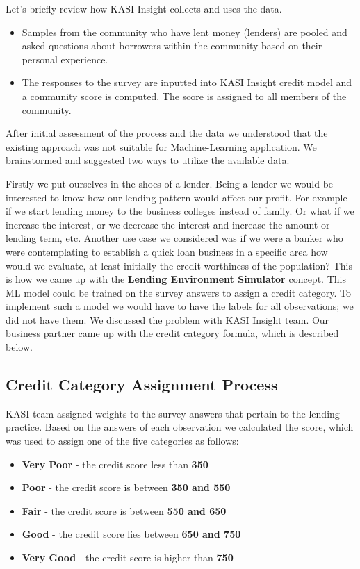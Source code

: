 Let's briefly review how KASI Insight collects and uses the data.

\begin{itemize}
\item
  Samples from the community who have lent money (lenders) are pooled
  and asked questions about borrowers within the community based on
  their personal experience.
\item
  The responses to the survey are inputted into KASI Insight credit
  model and a community score is computed. The score is assigned to all
  members of the community.
\end{itemize}

After initial assessment of the process and the data we understood that
the existing approach was not suitable for Machine-Learning application.
We brainstormed and suggested two ways to utilize the available data.

Firstly we put ourselves in the shoes of a lender. Being a lender we
would be interested to know how our lending pattern would affect our
profit. For example if we start lending money to the business colleges
instead of family. Or what if we increase the interest, or we decrease
the interest and increase the amount or lending term, etc. Another use
case we considered was if we were a banker who were contemplating to
establish a quick loan business in a specific area how would we
evaluate, at least initially the credit worthiness of the population?
This is how we came up with the \textbf{Lending Environment Simulator}
concept. This ML model could be trained on the survey answers to assign
a credit category. To implement such a model we would have to have the
labels for all observations; we did not have them. We discussed the
problem with KASI Insight team. Our business partner came up with the
credit category formula, which is described below.

\hypertarget{credit-category-assignment-process}{%
\subsection{Credit Category Assignment
Process}\label{credit-category-assignment-process}}

KASI team assigned weights to the survey answers that pertain to the
lending practice. Based on the answers of each observation we calculated
the score, which was used to assign one of the five categories as
follows:

\begin{itemize}
\tightlist
\item
  \textbf{Very Poor} - the credit score less than \textbf{350}
\item
  \textbf{Poor} - the credit score is between \textbf{350 and 550}
\item
  \textbf{Fair} - the credit score is between \textbf{550 and 650}
\item
  \textbf{Good} - the credit score lies between \textbf{650 and 750}
\item
  \textbf{Very Good} - the credit score is higher than \textbf{750}
\end{itemize}

